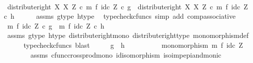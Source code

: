 \begin{isabellebody}
\ \ \isamarkupfalse%
\ \isamarkupfalse%
\ {\isachardoublequoteopen}distribute{\isacharunderscore}{\kern0pt}right\ X\ X\ Z\ {\isasymcirc}\isactrlsub c\ {\isacharparenleft}{\kern0pt}m\ {\isasymtimes}\isactrlsub f\ id\isactrlsub c\ Z{\isacharparenright}{\kern0pt}\ {\isasymcirc}\isactrlsub c\ g\ {\isacharequal}{\kern0pt}\ distribute{\isacharunderscore}{\kern0pt}right\ X\ X\ Z\ {\isasymcirc}\isactrlsub c\ {\isacharparenleft}{\kern0pt}m\ {\isasymtimes}\isactrlsub f\ id\isactrlsub c\ Z{\isacharparenright}{\kern0pt}\ {\isasymcirc}\isactrlsub c\ h{\isachardoublequoteclose}\isanewline
\ \ \ \ \isamarkupfalse%
\ assms\ g{\isacharunderscore}{\kern0pt}type\ h{\isacharunderscore}{\kern0pt}type\ \isamarkupfalse%
\ {\isacharparenleft}{\kern0pt}typecheck{\isacharunderscore}{\kern0pt}cfuncs{\isacharcomma}{\kern0pt}\ simp\ add{\isacharcolon}{\kern0pt}\ comp{\isacharunderscore}{\kern0pt}associative{}{\isacharparenright}{\kern0pt}\isanewline
\ \ \isamarkupfalse%
\ \isamarkupfalse%
\ {\isachardoublequoteopen}{\isacharparenleft}{\kern0pt}m\ {\isasymtimes}\isactrlsub f\ id\isactrlsub c\ Z{\isacharparenright}{\kern0pt}\ {\isasymcirc}\isactrlsub c\ g\ {\isacharequal}{\kern0pt}\ {\isacharparenleft}{\kern0pt}m\ {\isasymtimes}\isactrlsub f\ id\isactrlsub c\ Z{\isacharparenright}{\kern0pt}\ {\isasymcirc}\isactrlsub c\ h{\isachardoublequoteclose}\isanewline
\ \ \ \ \isamarkupfalse%
\ assms\ g{\isacharunderscore}{\kern0pt}type\ h{\isacharunderscore}{\kern0pt}type\ distribute{\isacharunderscore}{\kern0pt}right{\isacharunderscore}{\kern0pt}mono\ distribute{\isacharunderscore}{\kern0pt}right{\isacharunderscore}{\kern0pt}type\ monomorphism{\isacharunderscore}{\kern0pt}def{}\isanewline
\ \ \ \ \isamarkupfalse%
\ {\isacharparenleft}{\kern0pt}typecheck{\isacharunderscore}{\kern0pt}cfuncs{\isacharcomma}{\kern0pt}\ blast{\isacharparenright}{\kern0pt}\isanewline
\ \ \isamarkupfalse%
\ \isamarkupfalse%
\ {\isachardoublequoteopen}g\ {\isacharequal}{\kern0pt}\ h{\isachardoublequoteclose}\isanewline
\ \ \isamarkupfalse%
\ {\isacharminus}{\kern0pt}\isanewline
\ \ \ \ \isamarkupfalse%
\ {\isachardoublequoteopen}monomorphism\ {\isacharparenleft}{\kern0pt}m\ {\isasymtimes}\isactrlsub f\ id\isactrlsub c\ Z{\isacharparenright}{\kern0pt}{\isachardoublequoteclose}\isanewline
\ \ \ \ \ \ \isamarkupfalse%
\ assms\ cfunc{\isacharunderscore}{\kern0pt}cross{\isacharunderscore}{\kern0pt}prod{\isacharunderscore}{\kern0pt}mono\ id{\isacharunderscore}{\kern0pt}isomorphism\ iso{\isacharunderscore}{\kern0pt}imp{\isacharunderscore}{\kern0pt}epi{\isacharunderscore}{\kern0pt}and{\isacharunderscore}{\kern0pt}monic\ \isamarkupfalse%

\end{isabellebody}
